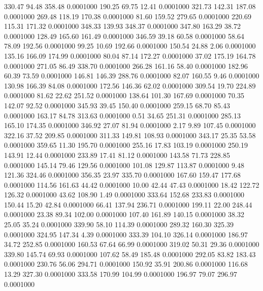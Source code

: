  330.47   94.48  358.48   0.0001000
 190.25   69.75   12.41   0.0001000
 321.73  142.31  187.08   0.0001000
 269.48  118.19  170.38   0.0001000
  81.60  159.52  279.65   0.0001000
 220.69  115.31  171.32   0.0001000
 348.33  139.93  348.37   0.0001000
 347.80  163.29   38.72   0.0001000
 128.49  165.60  161.49   0.0001000
 346.59   39.18   60.58   0.0001000
  58.64   78.09  192.56   0.0001000
  99.25   10.69  192.66   0.0001000
 150.54   24.88    2.06   0.0001000
 135.16  166.09  174.99   0.0001000
  80.04   87.14  172.27   0.0001000
  37.02  175.19  164.78   0.0001000
 271.05   86.49  338.70   0.0001000
 266.28  161.16   58.40   0.0001000
 182.96   60.39   73.59   0.0001000
 146.81  146.39  288.76   0.0001000
  82.07  160.55    9.46   0.0001000
 130.98  166.39   84.08   0.0001000
 172.56  146.36   62.02   0.0001000
 309.54   19.70  224.89   0.0001000
  81.62   22.62  251.52   0.0001000
 138.64  101.30  167.69   0.0001000
  70.35  142.07   92.52   0.0001000
 345.93   39.45  150.40   0.0001000
 259.15   68.70   85.43   0.0001000
 163.17   84.78  313.63   0.0001000
   0.51   34.65  251.31   0.0001000
 285.13  165.10  174.35   0.0001000
 346.92   27.07   81.94   0.0001000
   2.17    9.89  107.45   0.0001000
 322.16   37.52  209.85   0.0001000
 311.33  149.81  108.93   0.0001000
 343.17   25.35   53.58   0.0001000
 359.65   11.30  195.70   0.0001000
 255.16   17.83  103.19   0.0001000
 250.19  143.91   12.44   0.0001000
 233.89   17.41   81.12   0.0001000
 143.58   71.73  228.85   0.0001000
 145.14   79.46  129.56   0.0001000
 101.08  129.87  113.87   0.0001000
   9.48  121.36  324.46   0.0001000
 356.35   23.97  335.70   0.0001000
 167.60  159.47  177.68   0.0001000
 114.56  161.63   44.42   0.0001000
  10.00   42.44   47.43   0.0001000
  18.42  122.72  126.32   0.0001000
  43.62  108.90    1.49   0.0001000
 333.64  152.68  233.83   0.0001000
 150.44   15.20   42.84   0.0001000
  66.41  137.94  236.71   0.0001000
 199.11   22.00  248.44   0.0001000
  23.38   89.34  102.00   0.0001000
 107.40  161.89  140.15   0.0001000
  38.32   25.05   35.24   0.0001000
 339.90   58.10  114.39   0.0001000
 289.32  160.30  325.39   0.0001000
 324.95  147.34    4.39   0.0001000
 333.39  104.10  326.14   0.0001000
 186.97   34.72  252.85   0.0001000
 160.53   67.64   66.99   0.0001000
 319.02   50.31   29.36   0.0001000
 339.80  145.74   69.93   0.0001000
 107.62   58.49  185.48   0.0001000
 292.05   83.82  183.43   0.0001000
 230.76   56.06  294.71   0.0001000
 150.92   35.91  200.86   0.0001000
 116.68   13.29  327.30   0.0001000
 333.58  170.99  104.99   0.0001000
 196.97   79.07  296.97   0.0001000
